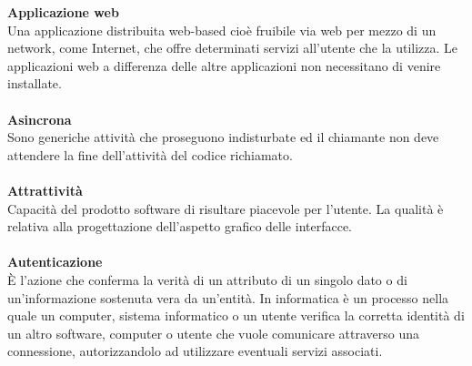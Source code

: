\textbf{Applicazione web}\\
Una applicazione distribuita web-based cioè fruibile via web per mezzo di un network, come Internet, che offre determinati servizi all'utente che la utilizza. Le applicazioni web a differenza delle altre applicazioni non necessitano di venire installate. \\ \\
\textbf{Asincrona}\\
Sono generiche attività che proseguono indisturbate ed il chiamante non deve attendere la fine dell'attività del codice richiamato. \\ \\
\textbf{Attrattività}\\
Capacità del prodotto software di risultare piacevole per l'utente. La qualità è relativa alla progettazione dell'aspetto grafico delle interfacce.\\ \\
\textbf{Autenticazione}\\
È l’azione che conferma la verità di un attributo di un singolo dato o di un’informazione sostenuta vera da un’entità. In informatica è un processo nella quale un computer, sistema informatico o un utente verifica la corretta identità di un altro software, computer o utente che vuole comunicare attraverso una connessione, autorizzandolo  ad utilizzare eventuali servizi associati.
\clearpage